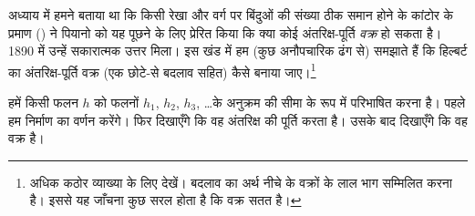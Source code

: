 \documentclass[../../../include/open-logic-section]{subfiles}
\begin{document}


अध्याय  में हमने बताया था कि किसी रेखा और वर्ग पर
बिंदुओं की संख्या ठीक समान होने के कांटोर के प्रमाण
() ने पियानो को यह पूछने के
लिए प्रेरित किया कि क्या कोई अंतरिक्ष-पूर्ति \emph{वक्र} हो सकता है। 1890
में उन्हें सकारात्मक उत्तर मिला। इस खंड में हम (कुछ अनौपचारिक ढंग से) समझाते
हैं कि हिल्बर्ट का अंतरिक्ष-पूर्ति वक्र (एक छोटे-से बदलाव सहित) कैसे बनाया
जाए।\footnote{अधिक कठोर व्याख्या के लिए \cite{Rose2010} देखें। बदलाव का अर्थ
नीचे के वक्रों के लाल भाग सम्मिलित करना है। इससे यह जाँचना कुछ सरल होता है कि
वक्र सतत है।}

हमें किसी फलन $h$ को फलनों $h_1$, $h_2$, $h_3$, \dots\@ के अनुक्रम की सीमा
के रूप में परिभाषित करना है। पहले हम निर्माण का वर्णन करेंगे। फिर दिखाएँगे कि
वह अंतरिक्ष की पूर्ति करता है। उसके बाद दिखाएँगे कि वह वक्र है।
\end{document}
